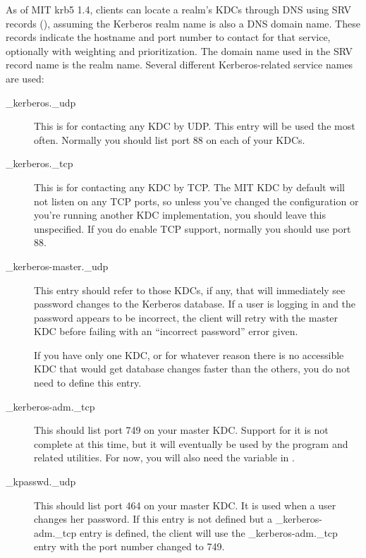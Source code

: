 \documentclass[letterpaper,10pt,english]{sphinxmanual}
\begin{document}
As of MIT krb5 1.4, clients can locate a realm’s KDCs through DNS
using SRV records (), assuming the Kerberos realm name is
also a DNS domain name.  These records indicate the hostname and port
number to contact for that service, optionally with weighting and
prioritization.  The domain name used in the SRV record name is the
realm name.  Several different Kerberos-related service names are
used:
\begin{description}
\item[{\_kerberos.\_udp}] \leavevmode
This is for contacting any KDC by UDP.  This entry will be used
the most often.  Normally you should list port 88 on each of your
KDCs.

\item[{\_kerberos.\_tcp}] \leavevmode
This is for contacting any KDC by TCP.  The MIT KDC by default
will not listen on any TCP ports, so unless you’ve changed the
configuration or you’re running another KDC implementation, you
should leave this unspecified.  If you do enable TCP support,
normally you should use port 88.

\item[{\_kerberos-master.\_udp}] \leavevmode
This entry should refer to those KDCs, if any, that will
immediately see password changes to the Kerberos database.  If a
user is logging in and the password appears to be incorrect, the
client will retry with the master KDC before failing with an
“incorrect password” error given.

If you have only one KDC, or for whatever reason there is no
accessible KDC that would get database changes faster than the
others, you do not need to define this entry.

\item[{\_kerberos-adm.\_tcp}] \leavevmode
This should list port 749 on your master KDC.  Support for it is
not complete at this time, but it will eventually be used by the
{\hyperref[\detokenize{admin/admin_commands/kadmin_local:kadmin-1}]{}} program and related utilities.  For now, you will
also need the  variable in {\hyperref[\detokenize{admin/conf_files/krb5_conf:krb5-conf-5}]{}}.

\item[{\_kpasswd.\_udp}] \leavevmode
This should list port 464 on your master KDC.  It is used when a
user changes her password.  If this entry is not defined but a
\_kerberos-adm.\_tcp entry is defined, the client will use the
\_kerberos-adm.\_tcp entry with the port number changed to 749.

\end{description}
\end{document}
